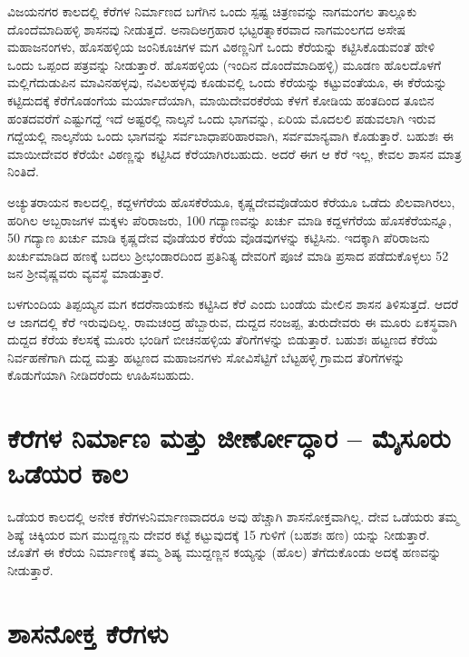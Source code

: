 ವಿಜಯನಗರ ಕಾಲದಲ್ಲಿ ಕೆರೆಗಳ ನಿರ್ಮಾಣದ ಬಗೆಗಿನ ಒಂದು ಸ್ಪಷ್ಟ ಚಿತ್ರಣವನ್ನು ನಾಗಮಂಗಲ ತಾಲ್ಲೂಕು ದೊಂದೆಮಾದಿಹಳ್ಳಿ ಶಾಸನವು ನೀಡುತ್ತದೆ. ಅನಾದಿಅಗ್ರಹಾರ ಭಟ್ಟರತ್ನಾಕರವಾದ ನಾಗಮಂಲಗದ ಅಸೇಷ ಮಹಾಜನಂಗಳು, ಹೊಸಹಳ್ಳಿಯ ಜಂನಿಕೂಚಿಗಳ ಮಗ ವಿಠಣ್ಣನಿಗೆ ಒಂದು ಕೆರೆಯನ್ನು ಕಟ್ಟಿಸಿಕೊಡುವಂತೆ ಹೇಳಿ ಒಂದು ಒಪ್ಪಂದ ಪತ್ರವನ್ನು ನೀಡುತ್ತಾರೆ. ಹೊಸಹಳ್ಳಿಯ (ಇಂದಿನ ದೊಂದೆಮಾದಿಹಳ್ಳಿ) ಮೂಡಣ ಹೊಲದೊಳಗೆ ಮಲ್ಲಿಗೆದುಡುಪಿನ ಮಾವಿನಹಳ್ಳವು, ನವಿಲಹಳ್ಳವು ಕೂಡುವಲ್ಲಿ ಒಂದು ಕೆರೆಯನ್ನು ಕಟ್ಟುವಂತೆಯೂ, ಈ ಕೆರೆಯನ್ನು ಕಟ್ಟಿದುದಕ್ಕೆ ಕೆರೆಗೊಡಂಗೆಯ ಮರ್ಯಾದೆಯಾಗಿ, ಮಾಯಿದೇವರಕೆರೆಯ ಕೆಳಗೆ ಕೋಡಿಯ ಹಂತದಿಂದ ತೂಬಿನ ಹಂತದವರೆಗೆ ಎಷ್ಟುಗದ್ದೆ ಇದೆ ಅಷ್ಟರಲ್ಲಿ ನಾಲ್ಕನೆ ಒಂದು ಭಾಗವನ್ನು, ಏರಿಯ ಮೊದಲಲಿ ಪಡುವಲಾಗಿ ಇರುವ ಗದ್ದೆಯಲ್ಲಿ ನಾಲ್ಕನೆಯ ಒಂದು ಭಾಗವನ್ನು ಸರ್ವಬಾಧಾಪರಿಹಾರವಾಗಿ, ಸರ್ವಮಾನ್ಯವಾಗಿ ಕೊಡುತ್ತಾರೆ. ಬಹುಶಃ ಈ ಮಾಯೀದೇವರ ಕೆರೆಯೇ ವಿಠಣ್ಣನ್ನು ಕಟ್ಟಿಸಿದ ಕೆರೆಯಾಗಿರಬಹುದು. ಅದರೆ ಈಗ ಆ ಕೆರೆ ಇಲ್ಲ, ಕೇವಲ ಶಾಸನ ಮಾತ್ರ ನಿಂತಿದೆ.

ಅಚ್ಯುತರಾಯನ ಕಾಲದಲ್ಲಿ, ಕದ್ದಳಗೆರೆಯ ಹೊಸಕೆರೆಯೂ, ಕೃಷ್ಣದೇವವೊಡೆಯರ ಕೆರೆಯೂ ಒಡೆದು ಖಿಲವಾಗಿರಲು, ಹರಿಗಿಲ ಅಬ್ಬರಾಜಗಳ ಮಕ್ಕಳು ಪೆರಿರಾಜರು, 100 ಗದ್ಯಾಣವನ್ನು ಖರ್ಚು ಮಾಡಿ ಕದ್ದಳಗೆರೆಯ ಹೊಸಕೆರೆಯನ್ನೂ, 50 ಗದ್ಯಾಣ ಖರ್ಚು ಮಾಡಿ ಕೃಷ್ಣದೇವ ವೊಡೆಯರ ಕೆರೆಯ ವೊಡವುಗಳನ್ನು ಕಟ್ಟಿಸಿನು. ಇದಕ್ಕಾಗಿ ಪೆರಿರಾಜನು ಖರ್ಚುಮಾಡಿದ ಹಣಕ್ಕೆ ಬದಲು ಶ‍್ರೀಭಂಡಾರದಿಂದ ಪ್ರತಿನಿತ್ಯ ದೇವರಿಗೆ ಪೂಜೆ ಮಾಡಿ ಪ್ರಸಾದ ಪಡೆದುಕೊಳ್ಳಲು 52 ಜನ ಶ‍್ರೀವೈಷ್ಣವರು ವ್ಯವಸ್ಥೆ ಮಾಡುತ್ತಾರೆ.

ಬಳಗುಂದಿಯ ತಿಪ್ಪಯ್ಯನ ಮಗ ಕದರೆನಾಯಕನು ಕಟ್ಟಿಸಿದ ಕೆರೆ ಎಂದು ಬಂಡೆಯ ಮೇಲಿನ ಶಾಸನ ತಿಳಿಸುತ್ತದೆ. ಆದರೆ ಆ ಜಾಗದಲ್ಲಿ ಕೆರೆ ಇರುವುದಿಲ್ಲ. ರಾಮಚಂದ್ರ ಹೆಬ್ಬಾರುವ, ದುದ್ದದ ನಂಜಪ್ಪ, ತುರುದೇವರು ಈ ಮೂರು ಏಕಸ್ಥವಾಗಿ ದುದ್ದದ ಕೆರೆಯ ಕೆಲಸಕ್ಕೆ ಮೂರು ಭಂಡಿಗೆ ಬೀಚನಹಳ್ಳಿಯ ತೆರಿಗೆಗಳನ್ನು ಬಿಡುತ್ತಾರೆ. ಬಹುಶಃ ಹಟ್ಟಣದ ಕೆರೆಯ ನಿರ್ವಹಣೆಗಾಗಿ ದುದ್ದ ಮತ್ತು ಹಟ್ಟಣದ ಮಹಾಜನಗಳು ಸೋವಿಸೆಟ್ಟಿಗೆ ಬೆಟ್ಟಹಳ್ಳಿ ಗ್ರಾಮದ ತೆರಿಗೆಗಳನ್ನು ಕೊಡುಗೆಯಾಗಿ ನೀಡಿದರೆಂದು ಊಹಿಸಬಹುದು.


\section{ಕೆರೆಗಳ ನಿರ್ಮಾಣ ಮತ್ತು ಜೀರ್ಣೋದ್ಧಾರ – ಮೈಸೂರು ಒಡೆಯರ ಕಾಲ}

ಒಡೆಯರ ಕಾಲದಲ್ಲಿ ಅನೇಕ ಕೆರೆಗಳುನಿರ್ಮಾಣವಾದರೂ ಅವು ಹೆಚ್ಚಾಗಿ ಶಾಸನೋಕ್ತವಾಗಿಲ್ಲ. ದೇವ ಒಡೆಯರು ತಮ್ಮ ಶಿಷ್ಯೆ ಚಿಕ್ಕಿಯರ ಮಗ ಮುದ್ದಣ್ಣನು ದೇವರ ಕಟ್ಟೆ ಕಟ್ಟುವುದಕ್ಕೆ 15 ಗುಳಿಗೆ (ಬಹಶಃ ಹಣ) ಯನ್ನು ನೀಡುತ್ತಾರೆ. ಜೊತೆಗೆ ಈ ಕೆರೆಯ ನಿರ್ಮಾಣಕ್ಕೆ ತಮ್ಮ ಶಿಷ್ಯ ಮುದ್ದಣ್ಣನ ಕಯ್ಯನ್ನು (ಹೊಲ) ತೆಗೆದುಕೊಂಡು ಅದಕ್ಕೆ ಹಣವನ್ನು ನೀಡುತ್ತಾರೆ.


\section{ಶಾಸನೋಕ್ತ ಕೆರೆಗಳು}

